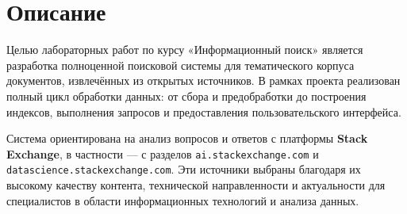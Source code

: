 \section{Описание}
Целью лабораторных работ по курсу «Информационный поиск» является разработка полноценной поисковой системы для тематического корпуса документов, извлечённых из открытых источников. В рамках проекта реализован полный цикл обработки данных: от сбора и предобработки до построения индексов, выполнения запросов и предоставления пользовательского интерфейса.

Система ориентирована на анализ вопросов и ответов с платформы \textbf{Stack Exchange}, в частности — с разделов \texttt{ai.stackexchange.com} и \texttt{datascience.stackexchange.com}. Эти источники выбраны благодаря их высокому качеству контента, технической направленности и актуальности для специалистов в области информационных технологий и анализа данных.

